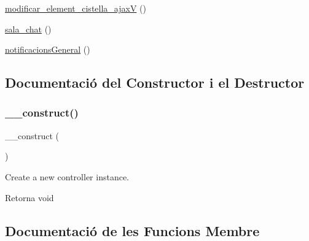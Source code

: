 \begin{DoxyCompactItemize}
\item 
\mbox{\hyperlink{class_app_1_1_http_1_1_controllers_1_1_home_controller_a06db941998f430f998973d0a3df62b22}{modificar\+\_\+element\+\_\+cistella\+\_\+ajaxV}} ()
\item 
\mbox{\hyperlink{class_app_1_1_http_1_1_controllers_1_1_home_controller_a4ced9bd18929c97f4f7f4d14043e05fe}{sala\+\_\+chat}} ()
\item 
\mbox{\hyperlink{class_app_1_1_http_1_1_controllers_1_1_home_controller_a39ed5fd818024ce78e4c2ee30ddcff79}{notificacions\+General}} ()
\end{DoxyCompactItemize}


\subsection{Documentació del Constructor i el Destructor}
\mbox{\label{class_app_1_1_http_1_1_controllers_1_1_home_controller_a095c5d389db211932136b53f25f39685}} 
\subsubsection{\texorpdfstring{\+\_\+\+\_\+construct()}{\_\_construct()}}
{\footnotesize\ttfamily \+\_\+\+\_\+construct (\begin{DoxyParamCaption}{ }\end{DoxyParamCaption})}

Create a new controller instance.

\begin{DoxyReturn}{Retorna}
void 
\end{DoxyReturn}


\subsection{Documentació de les Funcions Membre}
\mbox{\label{class_app_1_1_http_1_1_controllers_1_1_home_controller_a8cc1e5e6927209e7d5229d7954b1619e}} 
